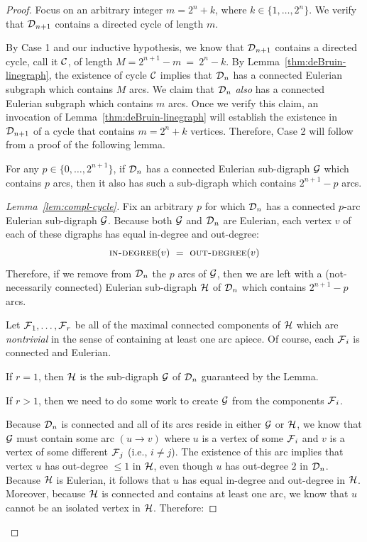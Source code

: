 \begin{proof}
\smallskip

\noindent
Focus on an arbitrary integer $m = 2^n +k$, where $k \in \{1, \ldots, 2^n\}$.  We verify that $\mbox{$\cal D$}_{n+1}$ contains a directed cycle of length $m$.

\medskip

By Case 1 and our inductive hypothesis, we know that $\mbox{$\cal D$}_{n+1}$ contains a directed cycle, call
it $\mbox{$\cal C$}$, of length $M = 2^{n+1} - m \ = \ 2^n -k$.  By Lemma~\ref{thm:deBruin-linegraph}, the
existence  of cycle $\mbox{$\cal C$}$ implies that $\mbox{$\cal D$}_n$ has a connected Eulerian subgraph which contains $M$ arcs.  We claim that $\mbox{$\cal D$}_n$ {\em also} has a connected Eulerian subgraph which contains $m$ arcs.  Once we verify this claim, an invocation of Lemma~\ref{thm:deBruin-linegraph} will establish the existence in $\mbox{$\cal D$}_{n+1}$ of a cycle that contains $m = 2^n +k$ vertices.  Therefore, Case 2 will follow from a proof of the following lemma.

\begin{lemma}
\label{lem:compl-cycle}
For any $p \in \{0, \ldots, 2^{n+1}\}$, if $\mbox{$\cal D$}_n$ has a connected Eulerian sub-digraph $\mbox{$\cal G$}$ which
contains $p$ arcs, then it also has such a sub-digraph which contains $2^{n+1} - p$ arcs.
\end{lemma}

\begin{proof}[Lemma~\ref{lem:compl-cycle}]
Fix an arbitrary $p$ for which $\mbox{$\cal D$}_n$ has a connected $p$-arc Eulerian sub-digraph $\mbox{$\cal G$}$.  Because both $\mbox{$\cal G$}$ and $\mbox{$\cal D$}_n$ are Eulerian, each vertex $v$ of each of these digraphs has equal in-degree and out-degree:
\[ \mbox{\sc in-degree}(v) \ = \ \mbox{\sc out-degree}(v) \]
Therefore, if we remove from $\mbox{$\cal D$}_n$ the $p$ arcs of $\mbox{$\cal G$}$, then we are left with a (not-necessarily connected) Eulerian sub-digraph $\mbox{$\cal H$}$ of $\mbox{$\cal D$}_n$ which contains $2^{n+1} - p$ arcs.

\smallskip

Let $\mbox{$\cal F$}_1, \ldots, \mbox{$\cal F$}_r$ be all of the maximal connected components of $\mbox{$\cal H$}$ which are {\em nontrivial} in the sense of containing at least one arc apiece.  Of course, each $\mbox{$\cal F$}_i$ is connected and Eulerian.

\smallskip

If $r=1$, then $\mbox{$\cal H$}$ is the sub-digraph $\mbox{$\cal G$}$ of $\mbox{$\cal D$}_n$ guaranteed by the Lemma.

If $r>1$, then we need to do some work to create $\mbox{$\cal G$}$ from the components $\mbox{$\cal F$}_i$.

\smallskip

\noindent
Because $\mbox{$\cal D$}_n$ is connected and all of its arcs reside in either $\mbox{$\cal G$}$ or $\mbox{$\cal H$}$, we know that $\mbox{$\cal G$}$ must contain some arc $(u \rightarrow v)$ where $u$ is a vertex of some $\mbox{$\cal F$}_i$ and $v$ is a vertex of some different $\mbox{$\cal F$}_j$ (i.e., $i \neq j$).  The existence of this arc implies that vertex $u$ has out-degree $\leq 1$ in $\mbox{$\cal H$}$, even though $u$ has out-degree $2$ in $\mbox{$\cal D$}_n$.  Because $\mbox{$\cal H$}$ is Eulerian, it follows that $u$ has equal in-degree and out-degree in $\mbox{$\cal H$}$.  Moreover, because $\mbox{$\cal H$}$ is connected and contains at least one arc, we know that $u$ cannot be an isolated vertex in $\mbox{$\cal H$}$.  Therefore:


\end{proof}
\end{proof}
